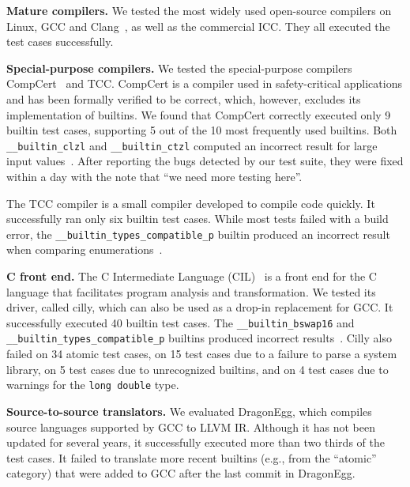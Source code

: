 \documentclass[sigconf,screen]{acmart}
\renewcommand{\paragraph}[1]{\textbf{#1}}
\newcommand\code[1]{\texttt{#1}}
\begin{document}
\paragraph{Mature compilers.}
We tested the most widely used open-source compilers on Linux, GCC and Clang~\cite{llvm}, as well as the commercial ICC.
They all executed the test cases successfully.

\paragraph{Special-purpose compilers.}
We tested the special-purpose compilers CompCert~\cite{compcert1,compcert2} and TCC.
CompCert is a compiler used in safety-critical applications and has been formally verified to be correct, which, however, excludes its implementation of builtins.
We found that CompCert correctly executed only 9 builtin test cases, supporting 5 out of the 10 most frequently used builtins.
Both \code{\_\_builtin\_clzl} and \code{\_\_builtin\_ctzl} computed an incorrect result for large input values~\cite{compcertissue}.
After reporting the bugs detected by our test suite, they were fixed within a day with the note that ``we need more testing here''.

The TCC compiler is a small compiler developed to compile code quickly.
It successfully ran only six builtin test cases.
While most tests failed with a build error, the \code{\_\_builtin\_types\_compatible\_p} builtin produced an incorrect result when comparing enumerations~\cite{tccissue}.

\paragraph{C front end.}
The C Intermediate Language (CIL)~\cite{cil} is a front end for the C language that facilitates program analysis and transformation.
We tested its driver, called cilly, which can also be used as a drop-in replacement for GCC.
It successfully executed 40 builtin test cases.
The \code{\_\_builtin\_bswap16} and \code{\_\_builtin\_types\_compatible\_p} builtins produced incorrect results~\cite{cilissue}.
Cilly also failed on 34 atomic test cases, on 15 test cases due to a failure to parse a system library, on 5 test cases due to unrecognized builtins, and on 4 test cases due to warnings for the \code{long double} type.

\paragraph{Source-to-source translators.}
We evaluated DragonEgg, which compiles source languages supported by GCC to LLVM IR.
Although it has not been updated for several years, it successfully executed more than two thirds of the test cases.
It failed to translate more recent builtins (e.g., from the ``atomic'' category) that were added to GCC after the last commit in DragonEgg.
\end{document}
